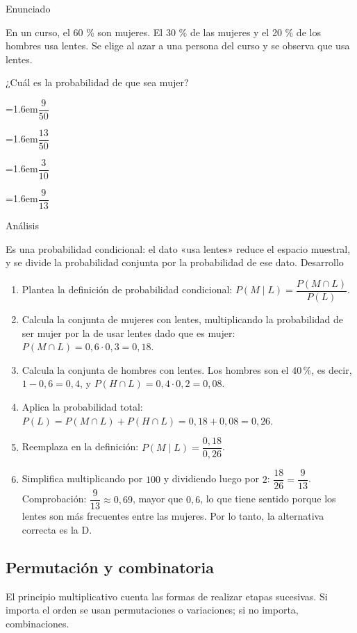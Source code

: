 \documentclass[10pt,a4paper,twocolumn]{article}
\newcommand{\alternativa}[2]{\par\noindent\hangindent=1.6em\hangafter=1\makebox[1.6em][l]{\tecla{#1}}#2\par}
\newcommand{\clave}[1]{\par\smallskip{\sffamily\footnotesize\color{esmeralda} Clave \teclaok{#1}}\par}
\begin{document}
\begin{ejemplo}
{\sffamily\footnotesize\color{zinc500} Enunciado}\par
En un curso, el 60 \% son mujeres. El 30 \% de las mujeres y el 20 \% de los hombres usa lentes. Se elige al azar a una persona del curso y se observa que usa lentes.

¿Cuál es la probabilidad de que sea mujer?
\alternativa{A}{$\dfrac{9}{50}$}
\alternativa{B}{$\dfrac{13}{50}$}
\alternativa{C}{$\dfrac{3}{10}$}
\alternativa{D}{$\dfrac{9}{13}$}
\clave{D}
{\sffamily\footnotesize\color{zinc500} Análisis}\par Es una probabilidad condicional: el dato «usa lentes» reduce el espacio muestral, y se divide la probabilidad conjunta por la probabilidad de ese dato.
{\sffamily\footnotesize\color{zinc500} Desarrollo}
\begin{enumerate}
  \item Plantea la definición de probabilidad condicional: $P(M\mid L) = \dfrac{P(M\cap L)}{P(L)}$.
  \item Calcula la conjunta de mujeres con lentes, multiplicando la probabilidad de ser mujer por la de usar lentes dado que es mujer: $P(M\cap L) = 0{,}6\cdot 0{,}3 = 0{,}18$.
  \item Calcula la conjunta de hombres con lentes. Los hombres son el $40\,\%$, es decir, $1 - 0{,}6 = 0{,}4$, y $P(H\cap L) = 0{,}4\cdot 0{,}2 = 0{,}08$.
  \item Aplica la probabilidad total: $P(L) = P(M\cap L) + P(H\cap L) = 0{,}18 + 0{,}08 = 0{,}26$.
  \item Reemplaza en la definición: $P(M\mid L) = \dfrac{0{,}18}{0{,}26}$.
  \item Simplifica multiplicando por $100$ y dividiendo luego por $2$: $\dfrac{18}{26} = \dfrac{9}{13}$. Comprobación: $\dfrac{9}{13}\approx 0{,}69$, mayor que $0{,}6$, lo que tiene sentido porque los lentes son más frecuentes entre las mujeres. Por lo tanto, la alternativa correcta es la D.
\end{enumerate}
\end{ejemplo}

\subsection{Permutación y combinatoria}

El principio multiplicativo cuenta las formas de realizar etapas sucesivas. Si importa el orden se usan permutaciones o variaciones; si no importa, combinaciones.
\end{document}
